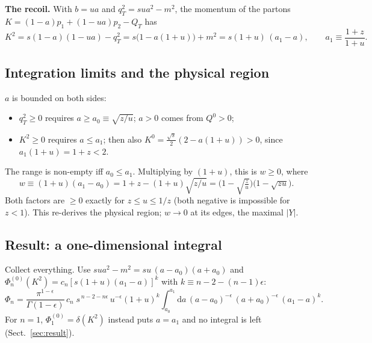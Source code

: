\documentclass[11pt,a4paper]{article}
\newcommand{\ep}{\epsilon}
\newcommand{\dd}{\mathrm{d}}
\begin{document}
\textbf{The recoil.} With $b=ua$ and $q_T^2=sua^2-m^2$, the momentum of the partons
$K=(1-a)p_1+(1-ua)p_2-Q_T$ has
\[
  K^2=s(1-a)(1-ua)-q_T^2=s\big(1-a(1+u)\big)+m^2=s(1+u)\,(a_1-a),\qquad a_1\equiv\frac{1+z}{1+u}.
\]

\subsection{Integration limits and the physical region}
$a$ is bounded on both sides:
\begin{itemize}
\item $q_T^2\ge0$ requires $a\ge a_0\equiv\sqrt{z/u}$; $a>0$ comes from $Q^0>0$;
\item $K^2\ge0$ requires $a\le a_1$; then also $K^0=\frac{\sqrt s}2(2-a(1+u))>0$, since $a_1(1+u)=1+z<2$.
\end{itemize}
The range is non-empty iff $a_0\le a_1$. Multiplying by $(1+u)$, this is $w\ge0$, where
\begin{equation}
  w\equiv(1+u)(a_1-a_0)=1+z-(1+u)\sqrt{z/u}=\Big(1-\sqrt{\tfrac zu}\Big)\Big(1-\sqrt{zu}\Big).
\end{equation}
Both factors are $\ge0$ exactly for $z\le u\le1/z$ (both negative is impossible for $z<1$). This re-derives the
physical region; $w\to0$ at its edges, the maximal $|Y|$.

\subsection{Result: a one-dimensional integral}
Collect everything. Use $s u a^2-m^2=s u\,(a-a_0)(a+a_0)$ and $\Phi^{(0)}_n(K^2)=c_n[s(1+u)(a_1-a)]^{k}$ with
$k\equiv n-2-(n-1)\ep$:
\begin{equation}
  \Phi_n=\frac{\pi^{1-\ep}}{\Gamma(1-\ep)}\,c_n\;s^{\,n-2-n\ep}\,u^{-\ep}(1+u)^{k}
  \int_{a_0}^{a_1}\!\dd a\,(a-a_0)^{-\ep}\,(a+a_0)^{-\ep}\,(a_1-a)^{k}.
  \label{eq:oned}
\end{equation}
For $n=1$, $\Phi^{(0)}_1=\delta(K^2)$ instead puts $a=a_1$ and no integral is left (Sect.~\ref{sec:result}).
\end{document}
